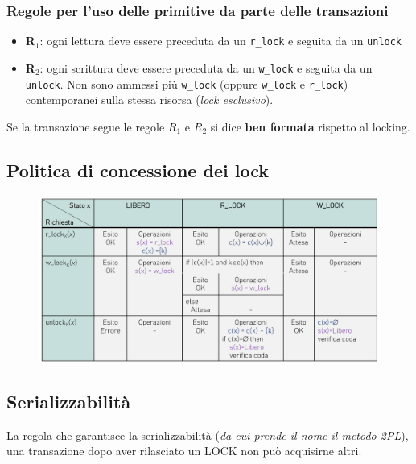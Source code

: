 \documentclass[oneside,a4paper,11pt]{book}
\theoremstyle{italicstyle}
\theoremstyle{normStyle}
\begin{document}
\subsubsection{Regole per l'uso delle primitive da parte delle transazioni}
\begin{itemize}
  \item \textbf{R$_1$}: ogni lettura deve essere preceduta da un \verb|r_lock| 
  e seguita da un \verb|unlock|
  \item \textbf{R$_2$}: ogni scrittura deve essere preceduta da un \verb|w_lock| e 
  seguita da un \verb|unlock|. Non sono ammessi più \verb|w_lock| (oppure \verb|w_lock| e \verb|r_lock|)
  contemporanei sulla stessa risorsa (\textit{lock esclusivo}).
\end{itemize}
Se la transazione segue le regole $R_1$ e $R_2$ si dice \textbf{ben formata} 
rispetto al locking.
\subsection{Politica di concessione dei lock}
\begin{figure}[H]
  \centering
  \includegraphics[width=12cm]{img/Tabella_gestione_lock.png}
\end{figure}
\subsection{Serializzabilità}
La regola che garantisce la serializzabilità (\textit{da cui prende il nome il metodo 
2PL}), una transazione dopo aver rilasciato un LOCK non può acquisirne altri.
\begin{figure}[H]
  \centering
\end{figure}
\end{document}
